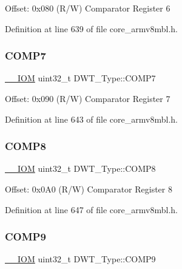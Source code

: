 Offset\+: 0x080 (R/W) Comparator Register 6 

Definition at line 639 of file core\+\_\+armv8mbl.\+h.

\mbox{\label{struct_d_w_t___type_a46db6f5289d840f0b9886ae598352452}} 
\subsubsection{\texorpdfstring{C\+O\+M\+P7}{COMP7}}
{\footnotesize\ttfamily \hyperlink{core__sc300_8h_ab6caba5853a60a17e8e04499b52bf691}{\+\_\+\+\_\+\+I\+OM} uint32\+\_\+t D\+W\+T\+\_\+\+Type\+::\+C\+O\+M\+P7}

Offset\+: 0x090 (R/W) Comparator Register 7 

Definition at line 643 of file core\+\_\+armv8mbl.\+h.

\mbox{\label{struct_d_w_t___type_aee138bc70746585e4ccf62557954c07f}} 
\subsubsection{\texorpdfstring{C\+O\+M\+P8}{COMP8}}
{\footnotesize\ttfamily \hyperlink{core__sc300_8h_ab6caba5853a60a17e8e04499b52bf691}{\+\_\+\+\_\+\+I\+OM} uint32\+\_\+t D\+W\+T\+\_\+\+Type\+::\+C\+O\+M\+P8}

Offset\+: 0x0\+A0 (R/W) Comparator Register 8 

Definition at line 647 of file core\+\_\+armv8mbl.\+h.

\mbox{\label{struct_d_w_t___type_abf79b853fc2d25de9c03bdb183e4aee0}} 
\subsubsection{\texorpdfstring{C\+O\+M\+P9}{COMP9}}
{\footnotesize\ttfamily \hyperlink{core__sc300_8h_ab6caba5853a60a17e8e04499b52bf691}{\+\_\+\+\_\+\+I\+OM} uint32\+\_\+t D\+W\+T\+\_\+\+Type\+::\+C\+O\+M\+P9}

